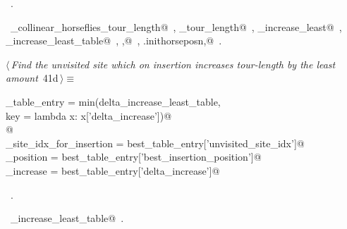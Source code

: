 \documentclass[11.5pt]{report}
\begin{document}
\begin{flushleft}
\begin{list}{}{}
\mbox{}\verb@                                   'delta_increase'          : delta_increase_least})@\\
\mbox{}\verb@@{\NWsep}
\end{list}
\vspace{-1.5ex}
\footnotesize
\begin{list}{}{\setlength{\itemsep}{-\parsep}\setlength{\itemindent}{-\leftmargin}}
\item \NWtxtMacroRefIn\ .
\item \NWtxtIdentsUsed\nobreak\  \verb@compute_collinear_horseflies_tour_length@\nobreak\ , \verb@current_tour_length@\nobreak\ , \verb@delta_increase_least@\nobreak\ , \verb@delta_increase_least_table@\nobreak\ , \verb@ibest,@\nobreak\ , \verb@self.inithorseposn,@\nobreak\ .
\item{}
\end{list}
\vspace{4ex}
\end{flushleft}


\vspace{-0.8cm}\newchunk 

\begin{flushleft} \small\label{scrap59}\raggedright\small
{} $\langle\,${\itshape Find the unvisited site which on insertion increases tour-length by the least amount}\nobreak\ {\footnotesize {41d}}$\,\rangle\equiv$
\vspace{-1ex}
\begin{list}{}{} \item
\mbox{}\verb@best_table_entry = min(delta_increase_least_table, \@\\
\mbox{}\verb@                         key = lambda x: x['delta_increase'])@\\
\mbox{}\verb@         @\\
\mbox{}\verb@unvisited_site_idx_for_insertion = best_table_entry['unvisited_site_idx']@\\
\mbox{}\verb@insertion_position               = best_table_entry['best_insertion_position']@\\
\mbox{}\verb@delta_increase                   = best_table_entry['delta_increase']@\\
\mbox{}\verb@@{\NWsep}
\end{list}
\vspace{-1.5ex}
\footnotesize
\begin{list}{}{\setlength{\itemsep}{-\parsep}\setlength{\itemindent}{-\leftmargin}}
\item \NWtxtMacroRefIn\ .
\item \NWtxtIdentsUsed\nobreak\  \verb@delta_increase_least_table@\nobreak\ .
\item{}
\end{list}
\vspace{4ex}
\end{flushleft}
\end{document}
